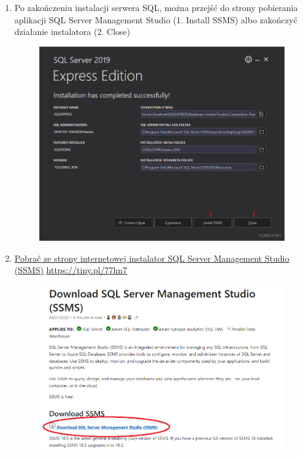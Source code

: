 \documentclass[12pt,a4paper]{article}
\begin{document}
\begin{enumerate}
				\item Po zakończeniu instalacji serwera SQL, można przejść do strony pobierania aplikacji SQL Server Management Studio (1. Install SSMS) albo zakończyć działanie instalatora (2. 						Close)
					\begin{figure}[H]
						\includegraphics[scale=0.3]{img/Local_Install_5.png}
						\centering
					\end{figure}				
				\item \href{https://docs.microsoft.com/en-us/sql/ssms/download-sql-server-management-studio-ssms}{Pobrać ze strony internetowej instalator SQL Server Management Studio (SSMS)}
						\url{https://tiny.pl/77hn7} 
					\begin{figure}[H]
						\includegraphics[scale=0.3]{img/Local_Install_5.5.png}

\end{figure}
\end{enumerate}
\end{document}

